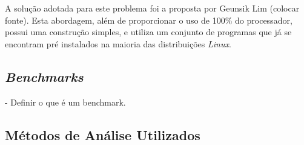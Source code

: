 A solução adotada para este problema foi a proposta por Geunsik Lim (colocar fonte). Esta abordagem, além de proporcionar o uso de 100\% do processador, possui uma construção simples, e utiliza um conjunto de programas que já se encontram pré instalados na maioria das distribuições \textit{Linux}.

\subsection{\textit{Benchmarks}}
- Definir o que é um benchmark.



\subsection{Métodos de Análise Utilizados}